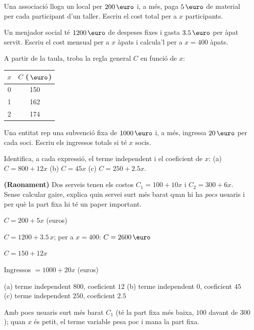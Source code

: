 \begin{exercicis}
\begin{exlist}
  \item Una associació lloga un local per $\num{200}\eur$ i, a més, paga $5\eur$
        de material per cada participant d'un taller. Escriu el cost total per a
        $x$ participants.
  \item Un menjador social té $\num{1200}\eur$ de despeses fixes i gasta $\num{3,5}\eur$
        per àpat servit. Escriu el cost mensual per a $x$ àpats i calcula'l per a
        $x=400$ àpats.
  \item A partir de la taula, troba la regla general $C$ en funció de $x$:
    \begin{center}
    \begin{tabular}{c c}
    \toprule
    $x$ & $C$ ($\eur$) \\
    \midrule
    0 & 150 \\
    1 & 162 \\
    2 & 174 \\
    \bottomrule
    \end{tabular}
    \end{center}
  \item Una entitat rep una subvenció fixa de $\num{1000}\eur$ i, a més, ingressa
        $20\eur$ per cada soci. Escriu els ingressos totals si té $x$ socis.
  \item Identifica, a cada expressió, el terme independent i el coeficient de $x$:
        \quad (a) $C = 800 + 12x$ \quad (b) $C = 45x$ \quad (c) $C = 250 + \num{2,5}x$.
  \item \textbf{(Raonament)} Dos serveis tenen els costos $C_1 = 100 + 10x$ i
        $C_2 = 300 + 6x$. Sense calcular gaire, explica quin servei surt més barat
        quan hi ha \emph{pocs} usuaris i per què la part fixa hi té un paper important.
\end{exlist}
\end{exercicis}

\begin{solucions}
\begin{sollist}
  \item $C = 200 + 5x$ (euros)
  \item $C = 1200 + \num{3,5}\,x$; \; per a $x=400$: $C = \num{2600}\eur$
  \item $C = 150 + 12x$
  \item Ingressos $= 1000 + 20x$ (euros)
  \item (a) terme independent $800$, coeficient $12$ \quad
        (b) terme independent $0$, coeficient $45$ \quad
        (c) terme independent $250$, coeficient $\num{2,5}$
  \item Amb pocs usuaris surt més barat $C_1$ (té la part fixa més baixa, $100$
        davant de $300$); quan $x$ és petit, el terme variable pesa poc i mana
        la part fixa.
\end{sollist}
\end{solucions}
